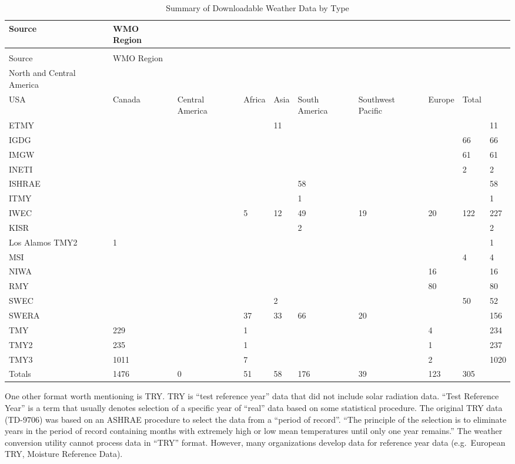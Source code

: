 \begin{longtable}[c]{p{0.6in}p{0.6in}p{0.6in}p{0.6in}p{0.6in}p{0.6in}p{0.6in}p{0.6in}p{0.6in}p{0.6in}}
\caption{Summary of Downloadable Weather Data by Type \label{table:summary-of-downloadable-weather-data-by-type}} \tabularnewline
\toprule 
Source & WMO Region &  \tabularnewline \midrule
\endfirsthead

\caption[]{Summary of Downloadable Weather Data by Type} \tabularnewline
\toprule 
Source & WMO Region &  \tabularnewline \midrule
\endhead

North and Central America &  &  &  &  &  &  \tabularnewline
USA & Canada & Central America & Africa & Asia & South America & Southwest Pacific & Europe & Total \tabularnewline
ETMY &  &  &  & 11 &  &  &  &  & 11 \tabularnewline
IGDG &  &  &  &  &  &  &  & 66 & 66 \tabularnewline
IMGW &  &  &  &  &  &  &  & 61 & 61 \tabularnewline
INETI &  &  &  &  &  &  &  & 2 & 2 \tabularnewline
ISHRAE &  &  &  &  & 58 &  &  &  & 58 \tabularnewline
ITMY &  &  &  &  & 1 &  &  &  & 1 \tabularnewline
IWEC &  &  & 5 & 12 & 49 & 19 & 20 & 122 & 227 \tabularnewline
KISR &  &  &  &  & 2 &  &  &  & 2 \tabularnewline
Los Alamos TMY2 & 1 &  &  &  &  &  &  &  & 1 \tabularnewline
MSI &  &  &  &  &  &  &  & 4 & 4 \tabularnewline
NIWA &  &  &  &  &  &  & 16 &  & 16 \tabularnewline
RMY &  &  &  &  &  &  & 80 &  & 80 \tabularnewline
SWEC &  &  &  & 2 &  &  &  & 50 & 52 \tabularnewline
SWERA &  &  & 37 & 33 & 66 & 20 &  &  & 156 \tabularnewline
TMY & 229 &  & 1 &  &  &  & 4 &  & 234 \tabularnewline
TMY2 & 235 &  & 1 &  &  &  & 1 &  & 237 \tabularnewline
TMY3 & 1011 &  & 7 &  &  &  & 2 &  & 1020 \tabularnewline
Totals & 1476 & 0 & 51 & 58 & 176 & 39 & 123 & 305 &  \tabularnewline
\bottomrule
\end{longtable}

One other format worth mentioning is TRY. TRY is ``test reference year'' data that did not include solar radiation data. ``Test Reference Year'' is a term that usually denotes selection of a specific year of ``real'' data based on some statistical procedure. The original TRY data (TD-9706) was based on an ASHRAE procedure to select the data from a ``period of record''. ``The principle of the selection is to eliminate years in the period of record containing months with extremely high or low mean temperatures until only one year remains.'' The weather conversion utility cannot process data in ``TRY'' format. However, many organizations develop data for reference year data (e.g.~European TRY, Moisture Reference Data).

